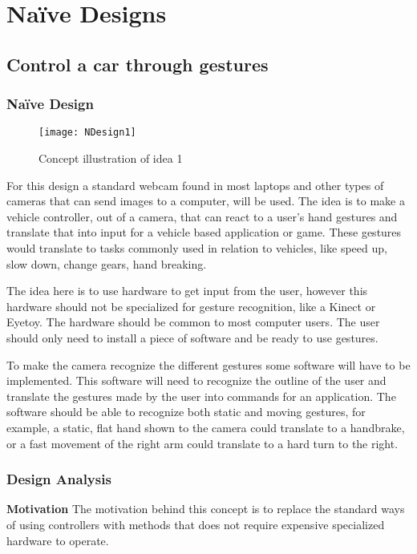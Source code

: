 \appendix
\appendixpage
\addappheadtotoc

\section{Naïve Designs} \label{NaiveDesigns}

\subsection{Control a car through gestures} \label{nd1}
\subsubsection*{Naïve Design}

\begin{figure}[h]
\centering
\texttt{[image: NDesign1]}
\caption{Concept illustration of idea 1}
\label{fig:ndesign1}
\end{figure}

For this design a standard webcam found in most laptops and other types of cameras that can send images to a computer, will be used. The idea is to make a vehicle controller, out of a camera, that can react to a user’s hand gestures and translate that into input for a vehicle based application or game. These gestures would translate to tasks commonly used in relation to vehicles, like speed up, slow down, change gears, hand breaking.


The idea here is to use hardware to get input from the user, however this hardware should not be specialized for gesture recognition, like a Kinect or Eyetoy. The hardware should be common to most computer users. The user should only need to install a piece of software and be ready to use gestures.


To make the camera recognize the different gestures some software will have to be implemented. This software will need to recognize the outline of the user and translate the gestures made by the user into commands for an application. The software should be able to recognize both static and moving gestures, for example, a static, flat hand shown to the camera could translate to a handbrake, or a fast movement of the right arm could translate to a hard turn to the right.

\subsubsection*{Design Analysis}
\noindent\textbf{Motivation} \newline
The motivation behind this concept is to replace the standard ways of using controllers with methods that does not require expensive specialized hardware to operate.

